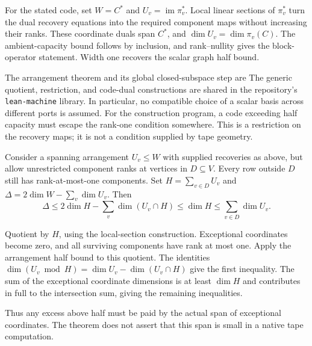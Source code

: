 \begin{outline}
For the stated code, set $W=C^*$ and $U_v=\operatorname{im}\pi_v^*$.
Local linear sections of $\pi_v^*$ turn the dual recovery equations
into the required component maps without increasing their ranks.
These coordinate duals span $C^*$, and $\dim U_v=\dim\pi_v(C)$.
The ambient-capacity bound follows by inclusion, and rank--nullity gives
the block-operator statement. Width one recovers the scalar graph
half bound.
\end{outline}

The arrangement theorem and its global closed-subspace step are
The generic quotient, restriction, and code-dual constructions are shared
in the repository's \texttt{lean-machine} library. In particular, no
compatible choice of a scalar basis across different ports is assumed.
For the construction program, a code exceeding half capacity must escape
the rank-one condition somewhere. This is a restriction on the recovery
maps; it is not a condition supplied by tape geometry.

\begin{theorem}\label{thm:rank-one-exceptions}
Consider a spanning arrangement $U_v\leq W$ with supplied recoveries as
above, but allow unrestricted component ranks at vertices in $D\subseteq V$.
Every row outside $D$ still has rank-at-most-one components. Set
$H=\sum_{v\in D}U_v$ and $\Delta=2\dim W-\sum_v\dim U_v$. Then
\[
 \Delta\leq2\dim H-\sum_v\dim(U_v\cap H)
 \leq\dim H\leq\sum_{v\in D}\dim U_v.
\]
\end{theorem}
\begin{outline}
Quotient by $H$, using the local-section construction. Exceptional
coordinates become zero, and all surviving components have rank at
most one. Apply the arrangement half bound to this quotient. The
identities $\dim(U_v\bmod H)=\dim U_v-\dim(U_v\cap H)$ give the first
inequality. The sum of the exceptional coordinate dimensions is at
least $\dim H$ and contributes in full to the intersection sum, giving
the remaining inequalities.
\end{outline}
Thus any excess above half must be paid by the actual span of exceptional
coordinates. The theorem does not assert that this span is small in a
native tape computation.
